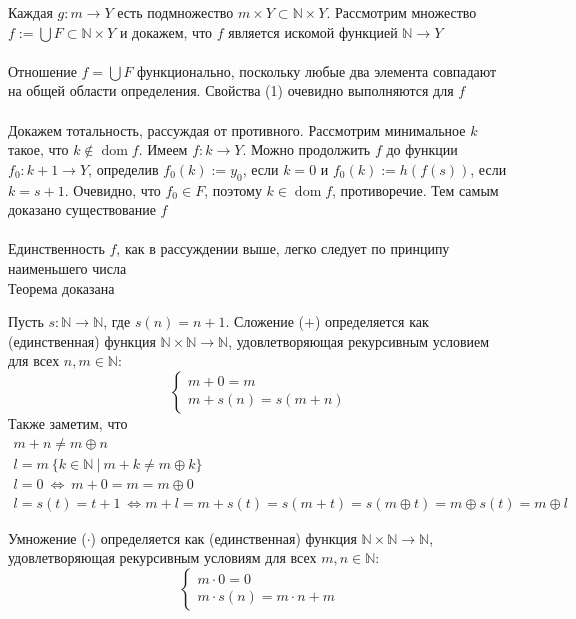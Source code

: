 Каждая $g: m \to Y$ есть подмножество $m \times Y \subset \mathbb{N} \times Y$. Рассмотрим множество $f := \bigcup F \subset \mathbb{N} \times Y$ и докажем, что $f$ является искомой функцией $\mathbb{N} \to Y$\\
\\
Отношение $f = \bigcup F$ функционально, поскольку любые два элемента совпадают на общей области определения. Свойства (1) очевидно выполняются для $f$\\
\\
Докажем тотальность, рассуждая от противного. Рассмотрим минимальное $k$ такое, что $k \notin \operatorname{dom} f$. Имеем $f: k \to Y$. Можно продолжить $f$ до функции $f_0: k+1 \to Y$, определив $f_0(k) := y_0$, если $k = 0$ и $f_0(k) := h(f(s))$, если $k = s+1$. Очевидно, что $f_0 \in F$, поэтому $k \in \operatorname{dom} f$, противоречие. Тем самым доказано существование $f$\\
\\
Единственность $f$, как в рассуждении выше, легко следует по принципу наименьшего числа\\
Теорема доказана


\begin{defn}[Сложение]
Пусть $s: \mathbb{N} \to \mathbb{N}$, где $s(n) = n+1$. Сложение ($+$) определяется как (единственная) функция $\mathbb{N} \times \mathbb{N} \to \mathbb{N}$, удовлетворяющая рекурсивным условием для всех $n,m \in \mathbb{N}$:
$$
\begin{cases}
	m + 0 = m\\
	m + s(n) = s(m+n)
\end{cases}
$$
Также заметим, что
\begin{gather*}
	m + n \ne m \oplus n\\
	l = m\ \{k \in \mathbb{N}\ |\ m+k \ne m \oplus k\}\\
	l = 0\ \Leftrightarrow\ m + 0 = m = m \oplus 0\\
	l = s(t) = t+1\ \Leftrightarrow m+l = m + s(t) = s(m+t) = s(m \oplus t) = m \oplus s(t) = m \oplus l
\end{gather*}
\end{defn}

\begin{defn}[Умножение]
Умножение ($\cdot$) определяется как (единственная) функция $\mathbb{N} \times \mathbb{N} \to \mathbb{N}$, удовлетворяющая рекурсивным условиям для всех $m,n \in \mathbb{N}$:
$$
\begin{cases}
	m \cdot 0 = 0\\
	m \cdot s(n) = m \cdot n + m
\end{cases}
$$
\end{defn}

